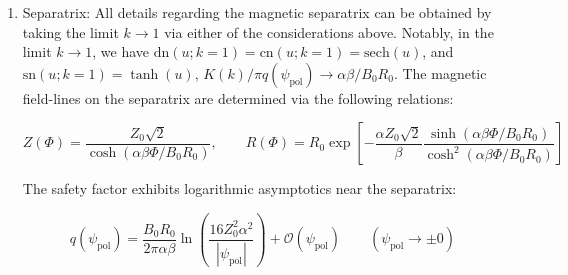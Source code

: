 \begin{enumerate}
    \begin{equation}
        \int_0^{Z_\text{max}}\sqrt{(Z_\text{max}^2-Z^2)(Z^2+Z_\text{img}^2)}\,\mathrm{d}Z=\frac{2\sqrt{2}kZ_0^3}{3\sqrt{2-k^2}}\left[E\left(\frac{1}{k}\right)+\frac{k^2-1}{2-k^2}K\left(\frac{1}{k}\right)\right]
    \end{equation}

    where the integral was evaluated in a similar fashion to the previous case. Substituting:

    \begin{equation}
        \psi_\text{tor}=\frac{2B_0R_0Z_0^2\alpha}{3\pi\beta}\frac{k}{\sqrt{2-k^2}}\left[E\left(\frac{1}{k}\right)+\frac{k^2-1}{2-k^2}K\left(\frac{1}{k}\right)\right]\quad\text{where}\quad k^2=\frac{2\sqrt{1+\psi_\text{pol}/|\Psi_\text{pol}|}}{1+\sqrt{1+\psi_\text{pol}/|\Psi_\text{pol}|}}
    \end{equation}

    All other relations that have been treated in the previous case can be determined by an analogous treatment. We shall, however, determine the expression of the safety factor by using the conditions $\theta(Z=Z_\text{max})=0$ and $\theta(Z=0)=\pi$, so that:

    \begin{equation}
        q(\psi_\text{pol})=\frac{B_0R_0}{\pi\alpha\beta}K\left(\frac{1}{k}\right)\frac{\sqrt{2-k^2}}{k}
    \end{equation}

    \item Separatrix: All details regarding the magnetic separatrix can be obtained by taking the limit $k\to1$ via either of the considerations above. Notably, in the limit $k\to1$, we have $\mathrm{dn}(u;k=1)=\mathrm{cn}(u;k=1)=\mathrm{sech}(u)$, and $\mathrm{sn}(u;k=1)=\tanh(u)$, $K(k)/\pi q(\psi_\text{pol})\to\alpha\beta/B_0R_0$. The magnetic field-lines on the separatrix are determined via the following relations:

    \begin{equation}
        Z(\Phi)=\frac{Z_0\sqrt{2}}{\cosh{(\alpha\beta\Phi/B_0R_0)}},\qquad R(\Phi)=R_0\exp{\left[-\frac{\alpha Z_0\sqrt{2}}{\beta}\frac{\sinh{(\alpha\beta\Phi/B_0R_0)}}{\cosh^2{(\alpha\beta\Phi/B_0R_0)}}\right]}
    \end{equation}

    The safety factor exhibits logarithmic asymptotics near the separatrix:

    \begin{equation}
        q(\psi_\text{pol})=\frac{B_0R_0}{2\pi\alpha\beta}\ln{\left(\frac{16Z_0^2\alpha^2}{|\psi_\text{pol}|}\right)}+\mathcal{O}(\psi_\text{pol})\qquad(\psi_\text{pol}\to\pm0)
    \end{equation}
\end{enumerate}

